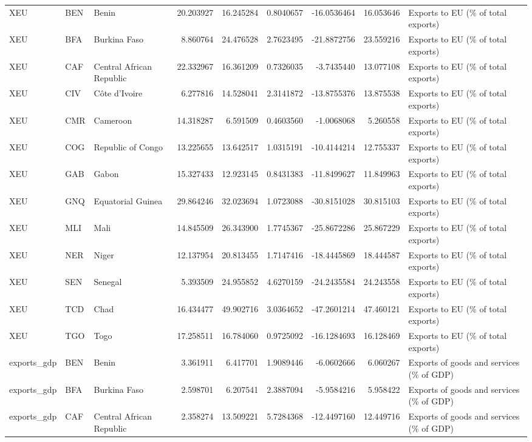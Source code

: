 \begin{table}
\begin{tabular}[t]{lllrrrrrl}
XEU & BEN & Benin & 20.203927 & 16.245284 & 0.8040657 & -16.0536464 & 16.053646 & Exports to EU (\% of total exports)\\
XEU & BFA & Burkina Faso & 8.860764 & 24.476528 & 2.7623495 & -21.8872756 & 23.559216 & Exports to EU (\% of total exports)\\
\addlinespace
XEU & CAF & Central African Republic & 22.332967 & 16.361209 & 0.7326035 & -3.7435440 & 13.077108 & Exports to EU (\% of total exports)\\
XEU & CIV & Côte d'Ivoire & 6.277816 & 14.528041 & 2.3141872 & -13.8755376 & 13.875538 & Exports to EU (\% of total exports)\\
XEU & CMR & Cameroon & 14.318287 & 6.591509 & 0.4603560 & -1.0068068 & 5.260558 & Exports to EU (\% of total exports)\\
XEU & COG & Republic of Congo & 13.225655 & 13.642517 & 1.0315191 & -10.4144214 & 12.755337 & Exports to EU (\% of total exports)\\
XEU & GAB & Gabon & 15.327433 & 12.923145 & 0.8431383 & -11.8499627 & 11.849963 & Exports to EU (\% of total exports)\\
\addlinespace
XEU & GNQ & Equatorial Guinea & 29.864246 & 32.023694 & 1.0723088 & -30.8151028 & 30.815103 & Exports to EU (\% of total exports)\\
XEU & MLI & Mali & 14.845509 & 26.343900 & 1.7745367 & -25.8672286 & 25.867229 & Exports to EU (\% of total exports)\\
XEU & NER & Niger & 12.137954 & 20.813455 & 1.7147416 & -18.4445869 & 18.444587 & Exports to EU (\% of total exports)\\
XEU & SEN & Senegal & 5.393509 & 24.955852 & 4.6270159 & -24.2435584 & 24.243558 & Exports to EU (\% of total exports)\\
XEU & TCD & Chad & 16.434477 & 49.902716 & 3.0364652 & -47.2601214 & 47.460121 & Exports to EU (\% of total exports)\\
\addlinespace
XEU & TGO & Togo & 17.258511 & 16.784060 & 0.9725092 & -16.1284693 & 16.128469 & Exports to EU (\% of total exports)\\
exports\_gdp & BEN & Benin & 3.361911 & 6.417701 & 1.9089446 & -6.0602666 & 6.060267 & Exports of goods and services (\% of GDP)\\
exports\_gdp & BFA & Burkina Faso & 2.598701 & 6.207541 & 2.3887094 & -5.9584216 & 5.958422 & Exports of goods and services (\% of GDP)\\
exports\_gdp & CAF & Central African Republic & 2.358274 & 13.509221 & 5.7284368 & -12.4497160 & 12.449716 & Exports of goods and services (\% of GDP)\\

\end{tabular}
\end{table}
